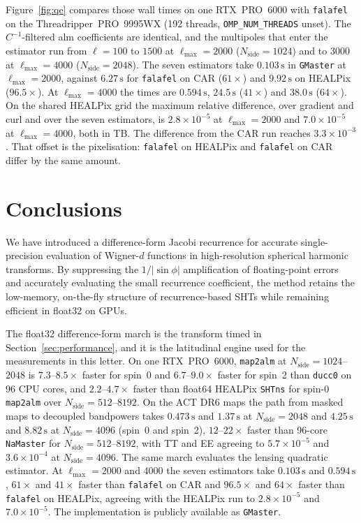 \documentclass[letters,usenatbib,useAMS]{mnras}
\begin{document}
Figure~\ref{fig:qe} compares those wall times on one RTX~PRO~6000 with \texttt{falafel} on the Threadripper~PRO~9995WX (192 threads, \texttt{OMP\_NUM\_THREADS} unset). The $C^{-1}$-filtered alm coefficients are identical, and the multipoles that enter the estimator run from $\ell=100$ to $1500$ at $\ell_{\max}=2000$ ($N_{\mathrm{side}}=1024$) and to $3000$ at $\ell_{\max}=4000$ ($N_{\mathrm{side}}=2048$). The seven estimators take $0.103\,\mathrm{s}$ in \texttt{GMaster} at $\ell_{\max}=2000$, against $6.27\,\mathrm{s}$ for \texttt{falafel} on CAR ($61\times$) and $9.92\,\mathrm{s}$ on HEALPix ($96.5\times$). At $\ell_{\max}=4000$ the times are $0.594\,\mathrm{s}$, $24.5\,\mathrm{s}$ ($41\times$) and $38.0\,\mathrm{s}$ ($64\times$). On the shared HEALPix grid the maximum relative difference, over gradient and curl and over the seven estimators, is $2.8\times10^{-5}$ at $\ell_{\max}=2000$ and $7.0\times10^{-5}$ at $\ell_{\max}=4000$, both in TB. The difference from the CAR run reaches $3.3\times10^{-3}$. That offset is the pixelisation: \texttt{falafel} on HEALPix and \texttt{falafel} on CAR differ by the same amount.

\section{Conclusions}
\label{sec:conclusion}
We have introduced a difference-form Jacobi recurrence for accurate single-precision evaluation of Wigner-$d$ functions in high-resolution spherical harmonic transforms. By suppressing the $1/|\sin\phi|$ amplification of floating-point errors and accurately evaluating the small recurrence coefficient, the method retains the low-memory, on-the-fly structure of recurrence-based SHTs while remaining efficient in float32 on GPUs.

The float32 difference-form march is the transform timed in Section~\ref{sec:performance}, and it is the latitudinal engine used for the measurements in this letter. On one RTX~PRO~6000, \texttt{map2alm} at $N_{\mathrm{side}}=1024$--$2048$ is $7.3$--$8.5\times$ faster for spin~0 and $6.7$--$9.0\times$ faster for spin~2 than \texttt{ducc0} on 96 CPU cores, and $2.2$--$4.7\times$ faster than float64 HEALPix \texttt{SHTns} for spin-0 \texttt{map2alm} over $N_{\mathrm{side}}=512$--$8192$. On the ACT DR6 maps the path from masked maps to decoupled bandpowers takes $0.473\,\mathrm{s}$ and $1.37\,\mathrm{s}$ at $N_{\mathrm{side}}=2048$ and $4.25\,\mathrm{s}$ and $8.82\,\mathrm{s}$ at $N_{\mathrm{side}}=4096$ (spin~0 and spin~2), $12$--$22\times$ faster than 96-core \texttt{NaMaster} for $N_{\mathrm{side}}=512$--$8192$, with TT and EE agreeing to $5.7\times10^{-5}$ and $3.6\times10^{-4}$ at $N_{\mathrm{side}}=4096$. The same march evaluates the lensing quadratic estimator. At $\ell_{\max}=2000$ and $4000$ the seven estimators take $0.103\,\mathrm{s}$ and $0.594\,\mathrm{s}$, $61\times$ and $41\times$ faster than \texttt{falafel} on CAR and $96.5\times$ and $64\times$ faster than \texttt{falafel} on HEALPix, agreeing with the HEALPix run to $2.8\times10^{-5}$ and $7.0\times10^{-5}$. The implementation is publicly available as \texttt{GMaster}.
\end{document}
